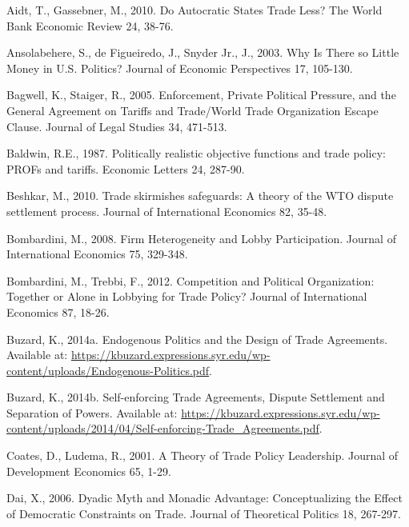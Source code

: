 \documentclass[10pt]{article}
\begin{document}
\begin{list}{}{\setlength{\leftmargin}{0.0in}\setlength{\rightmargin}{0.0in}\setlength{\itemindent}{0.0in}\setlength{\itemsep}{0.1in}}


\item Aidt, T., Gassebner, M., 2010. Do Autocratic States Trade Less? The World Bank Economic Review 24, 38-76.

\item Ansolabehere, S., de Figueiredo, J., Snyder Jr., J., 2003. Why Is There so Little Money in U.S. Politics? Journal of Economic Perspectives 17, 105-130.

\item Bagwell, K., Staiger, R., 2005. Enforcement, Private Political Pressure, and the General Agreement on Tariffs and Trade/World Trade Organization Escape Clause. Journal of Legal Studies 34, 471-513. 

\item Baldwin, R.E., 1987. Politically realistic objective functions and trade policy: PROFs and tariffs. Economic Letters 24, 287-90.

\item Beshkar, M., 2010. Trade skirmishes safeguards: A theory of the WTO dispute settlement process. Journal of International Economics 82, 35-48.

\item Bombardini, M., 2008. Firm Heterogeneity and Lobby Participation. Journal of International Economics 75, 329-348.

\item Bombardini, M., Trebbi, F., 2012. Competition and Political Organization: Together or Alone in Lobbying for Trade Policy? Journal of International Economics 87, 18-26.

\item Buzard, K., 2014a. Endogenous Politics and the Design of Trade Agreements. Available at: \url{https://kbuzard.expressions.syr.edu/wp-content/uploads/Endogenous-Politics.pdf}.

\item Buzard, K., 2014b. Self-enforcing Trade Agreements, Dispute Settlement and Separation of Powers. Available at: \url{https://kbuzard.expressions.syr.edu/wp-content/uploads/2014/04/Self-enforcing-Trade_Agreements.pdf}.

\item Coates, D., Ludema, R., 2001. A Theory of Trade Policy Leadership. Journal of Development Economics 65, 1-29.

\item Dai, X., 2006. Dyadic Myth and Monadic Advantage: Conceptualizing the Effect of Democratic Constraints on Trade. Journal of Theoretical Politics 18, 267-297.


\end{list}
\end{document}
